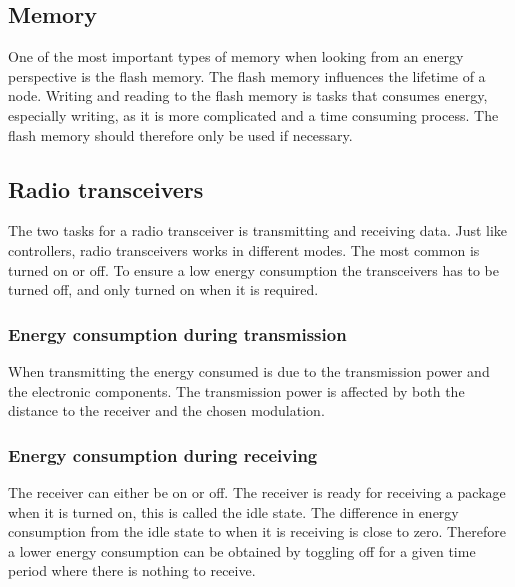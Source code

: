 \subsection{Memory}
One of the most important types of memory when looking from an energy perspective is the flash memory.
The flash memory influences the lifetime of a node. Writing and reading to the flash memory is tasks that consumes energy, especially writing, as it is more complicated and a time consuming process. The flash memory should therefore only be used if necessary. 
 
\subsection{Radio transceivers}
The two tasks for a radio transceiver is transmitting and receiving data. Just like controllers, radio transceivers works in different modes. The most common is turned on or off. To ensure a low energy consumption the transceivers has to be turned off, and only turned on when it is required.
  
\subsubsection*{Energy consumption during transmission}
When transmitting the energy consumed is due to the transmission power and the electronic components. The transmission power is affected by both the distance to the receiver and the chosen modulation.

\subsubsection*{Energy consumption during receiving}
The receiver can either be on or off. The receiver is ready for receiving a package when it is turned on, this is called the idle state. The difference in energy consumption from the idle state to when it is receiving is close to zero. Therefore a lower energy consumption can be obtained by toggling off for a given time period where there is nothing to receive.